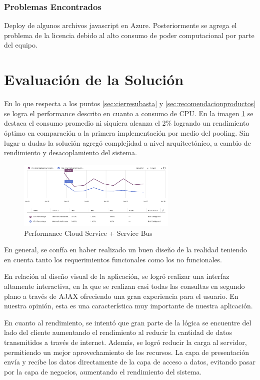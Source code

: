 \documentclass[journal]{IEEEtran}
\begin{document}
\subsubsection{Problemas Encontrados}
Deploy de algunos archivos javascript en Azure. Posteriormente se agrega el problema de la licencia debido al alto consumo de poder computacional por parte del equipo.

\section{Evaluación de la Solución}
En lo que respecta a los puntos \ref{sec:cierresubasta} y \ref{sec:recomendacionproductos} se logra el performance descrito en cuanto a consumo de CPU. En la imagen \ref{im:cloudservice} se destaca el consumo promedio ni siquiera alcanza el 2\% logrando un rendimiento óptimo en comparación a la primera implementación por medio del pooling.
Sin lugar a dudas la solución agregó complejidad a nivel arquitectónico, a cambio de rendimiento y desacoplamiento del sistema.


\begin{figure}[]
  \centering
    \includegraphics[width=3in]{./figuras/cloudservice.png}
  \caption{Performance Cloud Service + Service Bus}
  \label{im:cloudservice}
\end{figure} 

En general, se confía en haber realizado un buen diseño de la realidad teniendo en cuenta tanto los requerimientos funcionales como los no funcionales.

En relación al diseño visual de la aplicación, se logró realizar una interfaz altamente interactiva, en la que se realizan casi todas las consultas en segundo plano a través de AJAX ofreciendo una gran experiencia para el usuario. En nuestra opinión, esta es una característica muy importante de nuestra aplicación.

En cuanto al rendimiento, se intentó que gran parte de la lógica se encuentre del lado del cliente aumentando el rendimiento al reducir la cantidad de datos transmitidos a través de internet. Además, se logró reducir la carga al servidor, permitiendo un mejor aprovechamiento de los recursos. La capa de presentación envía y recibe los datos directamente de la capa de acceso a datos, evitando pasar por la capa de negocios, aumentando el rendimiento del sistema.
\end{document}
